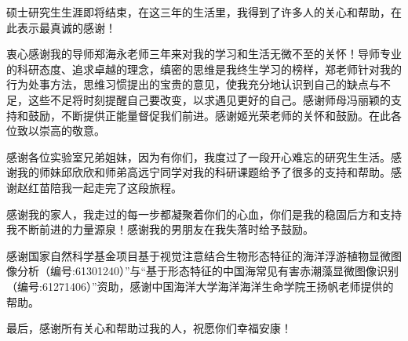 
\begin{ack}
 硕士研究生生涯即将结束，在这三年的生活里，我得到了许多人的关心和帮助，在此表示最真诚的感谢！

衷心感谢我的导师郑海永老师三年来对我的学习和生活无微不至的关怀！导师专业的科研态度、追求卓越的理念，缜密的思维是我终生学习的榜样，郑老师针对我的行为处事方法，思维习惯提出的宝贵的意见，使我充分地认识到自己的缺点与不足，这些不足将时刻提醒自己要改变，以求遇见更好的自己。感谢师母冯丽颖的支持和鼓励，不断提供正能量督促我们前进。感谢姬光荣老师的关怀和鼓励。在此各位致以崇高的敬意。

感谢各位实验室兄弟姐妹，因为有你们，我度过了一段开心难忘的研究生生活。感谢我的师妹邱欣欣和师弟高远宁同学对我的科研课题给予了很多的支持和帮助。感谢赵红苗陪我一起走完了这段旅程。

感谢我的家人，我走过的每一步都凝聚着你们的心血，你们是我的稳固后方和支持我不断前进的力量源泉！感谢我的男朋友在我失落时给予鼓励。

感谢国家自然科学基金项目基于视觉注意结合生物形态特征的海洋浮游植物显微图像分析（编号:61301240）”与“基于形态特征的中国海常见有害赤潮藻显微图像识别（编号:61271406）”资助，感谢中国海洋大学海洋海洋生命学院王扬帆老师提供的帮助。

最后，感谢所有关心和帮助过我的人，祝愿你们幸福安康！
\end{ack}
